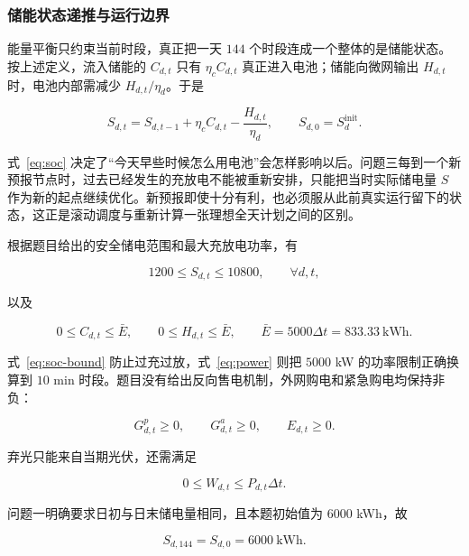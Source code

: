 \subsubsection{储能状态递推与运行边界}

能量平衡只约束当前时段，真正把一天 $144$ 个时段连成一个整体的是储能状态。按上述定义，流入储能的 $C_{d,t}$ 只有 $\eta_c C_{d,t}$ 真正进入电池；储能向微网输出 $H_{d,t}$ 时，电池内部需减少 $H_{d,t}/\eta_d$。于是

\begin{equation}
    S_{d,t}=S_{d,t-1}+\eta_c C_{d,t}-\frac{H_{d,t}}{\eta_d},
    \qquad S_{d,0}=S^{\mathrm{init}}_d .
    \label{eq:soc}
\end{equation}

式~\eqref{eq:soc} 决定了“今天早些时候怎么用电池”会怎样影响以后。问题三每到一个新预报节点时，过去已经发生的充放电不能被重新安排，只能把当时实际储电量 $S$ 作为新的起点继续优化。新预报即使十分有利，也必须服从此前真实运行留下的状态，这正是滚动调度与重新计算一张理想全天计划之间的区别。

根据题目给出的安全储电范围和最大充放电功率，有

\begin{equation}
    1200\le S_{d,t}\le10800,
    \qquad \forall d,t ,
    \label{eq:soc-bound}
\end{equation}

以及

\begin{equation}
    0\le C_{d,t}\le\bar E,\qquad
    0\le H_{d,t}\le\bar E,
    \qquad \bar E=5000\Delta t=833.33\ \text{kWh}.
    \label{eq:power}
\end{equation}

式~\eqref{eq:soc-bound} 防止过充过放，式~\eqref{eq:power} 则把 $5000$ kW 的功率限制正确换算到 $10$ min 时段。题目没有给出反向售电机制，外网购电和紧急购电均保持非负：

\begin{equation}
    G^{p}_{d,t}\ge0,\qquad G^{a}_{d,t}\ge0,\qquad E_{d,t}\ge0 .
    \label{eq:nonneg}
\end{equation}

弃光只能来自当期光伏，还需满足

\begin{equation}
    0\le W_{d,t}\le P_{d,t}\Delta t .
    \label{eq:curtail}
\end{equation}

问题一明确要求日初与日末储电量相同，且本题初始值为 $6000$ kWh，故

\begin{equation}
    S_{d,144}=S_{d,0}=6000\ \text{kWh}.
    \label{eq:terminal-q1}
\end{equation}

